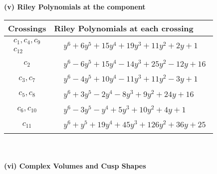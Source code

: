 \documentclass[1p]{elsarticle_modified}
\theoremstyle{definition}
\begin{document}
\newpage\renewcommand{\arraystretch}{1}
\flushleft \textbf{(v) Riley Polynomials at the component}\newline \\
\begin{tabular}{m{50pt}|m{274pt}}
Crossings & \hspace{64pt}Riley Polynomials at each crossing \\
\hline $$\begin{aligned}c_{1},c_{4},c_{9}\\c_{12}\end{aligned}$$&$\begin{aligned}
&y^6+6 y^5+15 y^4+19 y^3+11 y^2+2 y+1
\end{aligned}$\\
\hline $$\begin{aligned}c_{2}\end{aligned}$$&$\begin{aligned}
&y^6-6 y^5+15 y^4-14 y^3+25 y^2-12 y+16
\end{aligned}$\\
\hline $$\begin{aligned}c_{3},c_{7}\end{aligned}$$&$\begin{aligned}
&y^6-4 y^5+10 y^4-11 y^3+11 y^2-3 y+1
\end{aligned}$\\
\hline $$\begin{aligned}c_{5},c_{8}\end{aligned}$$&$\begin{aligned}
&y^6+3 y^5-2 y^4-8 y^3+9 y^2+24 y+16
\end{aligned}$\\
\hline $$\begin{aligned}c_{6},c_{10}\end{aligned}$$&$\begin{aligned}
&y^6-3 y^5- y^4+5 y^3+10 y^2+4 y+1
\end{aligned}$\\
\hline $$\begin{aligned}c_{11}\end{aligned}$$&$\begin{aligned}
&y^6+y^5+19 y^4+45 y^3+126 y^2+36 y+25
\end{aligned}$\\
\hline
\end{tabular}\\~\\
\newpage\flushleft \textbf{(vi) Complex Volumes and Cusp Shapes}
\end{document}
